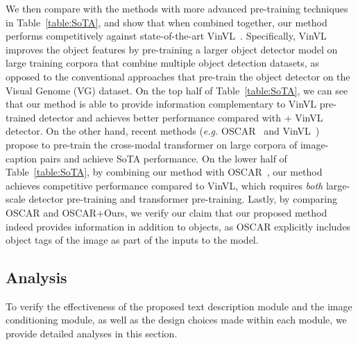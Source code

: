 \documentclass[10pt,twocolumn,letterpaper]{article}
\begin{document}
We then compare with the methods with more advanced pre-training techniques in Table~\ref{table:SoTA}, and show that when combined together, our method performs competitively against state-of-the-art VinVL~\cite{zhang2021vinvl}.
Specifically, VinVL improves the object features by pre-training a larger object detector model on large training corpora that combine multiple object detection datasets, as opposed to the conventional approaches that pre-train the object detector on the Visual Genome (VG) dataset.
On the top half of Table~\ref{table:SoTA}, we can see that our method is able to provide information complementary to VinVL pre-trained detector and achieves better performance compared with  + VinVL detector.
On the other hand, recent methods (\textit{e.g.} OSCAR~\cite{li2020oscar} and VinVL~\cite{zhang2021vinvl}) propose to pre-train the cross-modal transformer on large corpora of image-caption pairs and achieve SoTA performance.
On the lower half of Table~\ref{table:SoTA}, by combining our method with OSCAR~\cite{li2020oscar}, our method achieves competitive performance compared to VinVL, which requires \textit{both} large-scale detector pre-training and transformer pre-training.
Lastly, by comparing OSCAR and OSCAR+Ours, we verify our claim that our proposed method indeed provides information in addition to objects, as OSCAR explicitly includes object tags of the image as part of the inputs to the model.



\subsection{Analysis}\label{section:analysis}

To verify the effectiveness of the proposed text description module and the image conditioning module, as well as the design choices made within each module, we provide detailed analyses in this section.
\end{document}
